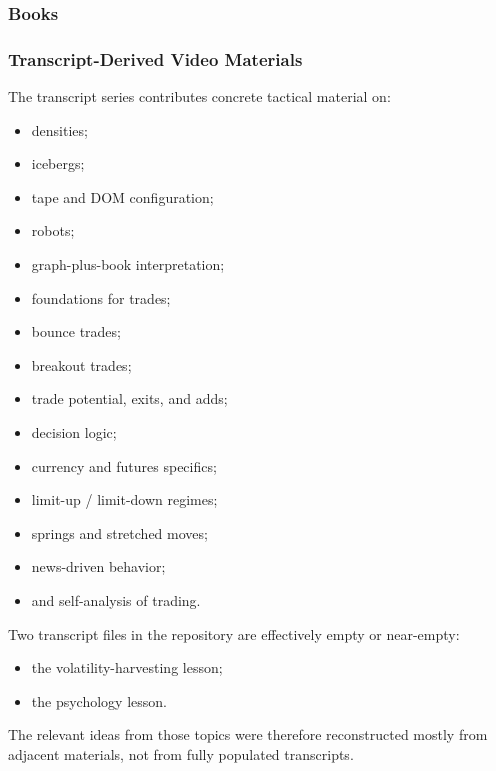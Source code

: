\subsubsection{Books}


\subsubsection{Transcript-Derived Video Materials}

The transcript series contributes concrete tactical material on:
\begin{itemize}
  \item densities;
  \item icebergs;
  \item tape and DOM configuration;
  \item robots;
  \item graph-plus-book interpretation;
  \item foundations for trades;
  \item bounce trades;
  \item breakout trades;
  \item trade potential, exits, and adds;
  \item decision logic;
  \item currency and futures specifics;
  \item limit-up / limit-down regimes;
  \item springs and stretched moves;
  \item news-driven behavior;
  \item and self-analysis of trading.
\end{itemize}

Two transcript files in the repository are effectively empty or near-empty:
\begin{itemize}
  \item the volatility-harvesting lesson;
  \item the psychology lesson.
\end{itemize}
The relevant ideas from those topics were therefore reconstructed mostly from adjacent materials, not from fully populated transcripts.

